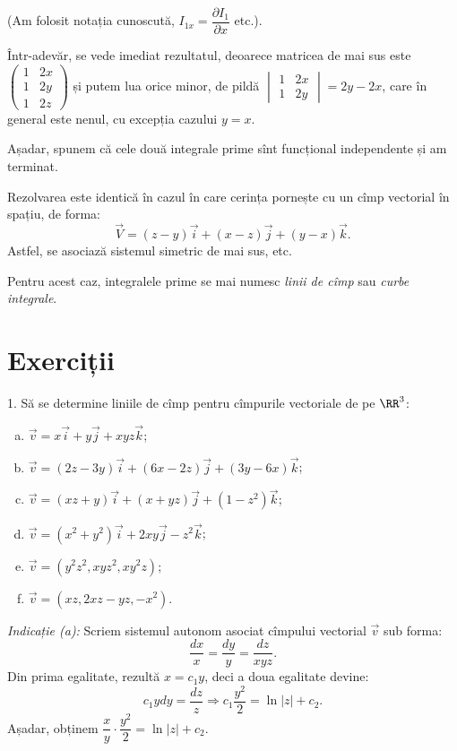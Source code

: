 (Am folosit notația cunoscută, $ I_{1x} = \dfrac{\partial I_1}{\partial x} $ etc.).

Într-adevăr, se vede imediat rezultatul, deoarece matricea de mai sus este
$  \begin{pmatrix}
    1 & 2x \\
    1 & 2y \\
    1 & 2z
  \end{pmatrix}
$
și putem lua orice minor, de pildă $ \begin{vmatrix} 1 & 2x \\ 1 & 2y \end{vmatrix} = 2y - 2x $,
care în general este nenul, cu excepția cazului $ y = x $.

Așadar, spunem că cele două integrale prime sînt funcțional
independente și am terminat.

\begin{remark}\label{rk:sist-cimp}
  Rezolvarea este identică în cazul în care cerința pornește cu un
  cîmp vectorial în spațiu, de forma:
  \[
    \vec{V} = (z - y)\vec{i} + (x - z)\vec{j} + (y - x) \vec{k}.
  \]
  Astfel, se asociază sistemul simetric de mai sus, etc.

  Pentru acest caz, integralele prime se mai numesc \emph{linii de cîmp}
  sau \emph{curbe integrale}.
\end{remark}


\section{Exerciții}

1. Să se determine liniile de cîmp pentru cîmpurile vectoriale de pe $\RR^3$:
\begin{enumerate}[(a)]
\item $\vec{v} = x\vec{i} + y \vec{j} + xyz \vec{k}$;
\item $\vec{v} = (2z - 3y)\vec{i} + (6x - 2z)\vec{j} + (3y - 6x)\vec{k}$;
\item $\vec{v} = (xz + y) \vec{i} + (x + yz) \vec{j} + (1 - z^2)\vec{k}$;
\item $\vec{v} = (x^2 + y^2)\vec{i} + 2xy \vec{j} - z^2 \vec{k}$;
\item $ \vec{v} = (y^2z^2, xyz^2, xy^2z) $;
\item $ \vec{v} = (xz, 2xz - yz, -x^2) $.
\end{enumerate}

\emph{Indicație (a):} Scriem sistemul autonom asociat cîmpului vectorial $\vec{v}$
sub forma:
\[
  \frac{dx}{x} = \frac{dy}{y} = \frac{dz}{xyz}.
\]
Din prima egalitate, rezultă $x = c_1 y$, deci a doua egalitate devine:
\[
  c_1 ydy = \frac{dz}{z} \Rightarrow c_1 \frac{y^2}{2} = \ln |z| + c_2.
\]
Așadar, obținem $\dfrac{x}{y} \cdot \dfrac{y^2}{2} = \ln |z| + c_2$.

